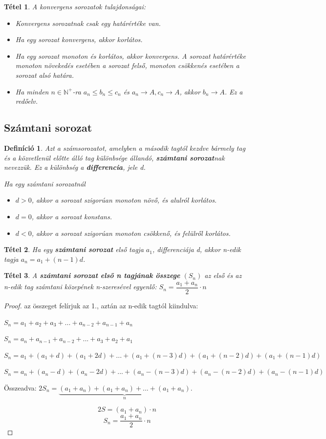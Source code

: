 \documentclass[12pt,a4paper]{article}
\newtheorem{theorem}{Tétel} [section]
\newtheorem{definition}{Definíció} [section]
\begin{document}
\begin{theorem}
A konvergens sorozatok tulajdonságai:
\begin{itemize}
\item Konvergens sorozatnak csak egy határértéke van.
\item Ha egy sorozat konvergens, akkor korlátos.
\item Ha egy sorozat monoton és korlátos, akkor konvergens. A sorozat határértéke monoton növekedés esetében a sorozat felső, monoton csökkenés esetében a sorozat alsó határa.
\item Ha minden $n\in \mathbb{N}^+$-ra $a_n\leq b_n \leq c_n$ és $a_n\to A, c_n\to A$, akkor $b_n\to A$. Ez a redőelv.
\end{itemize}
\end{theorem}

\subsection{Számtani sorozat}
\begin{definition}
Azt a számsorozatot, amelyben a második tagtól kezdve bármely tag és a közvetlenül előtte álló tag különbsége állandó, \textbf{számtani sorozat}nak nevezzük. Ez a különbség a \textbf{differencia}, jele d.

Ha egy számtani sorozatnál
\begin{itemize}
\item $d > 0$, akkor a sorozat szigorúan monoton növő, és alulról korlátos.
\item $d = 0$, akkor a sorozat konstans.
\item $d < 0$, akkor a sorozat szigorúan monoton csökkenő, és felülről korlátos.
\end{itemize}
\end{definition}

\begin{theorem}
 Ha egy \textbf{számtani sorozat} első tagja $a_1$, differenciája d, akkor n-edik tagja $a_n = a_1 + (n - 1)d$.
\end{theorem}

\begin{theorem}
A \textbf{számtani sorozat első n tagjának összege} $(S_n)$ az első és az n-edik tag számtani közepének n-szeresével egyenlő: $S_n=\dfrac{a_1+a_n}{2}\cdot n$
\end{theorem}
\begin{proof}
az összeget felírjuk az 1., aztán az n-edik tagtól kiindulva:

$S_n=a_1+a_2+a_3+...+a_{n-2}+a_{n-1}+a_n$

$S_n=a_n+a_{n-1}+a_{n-2}+...+a_3+a_2+a_1$

$S_n=a_1+(a_1+d)+(a_1+2d)+...+(a_1+(n-3)d)+(a_1+(n-2)d)+(a_1+(n-1)d)$

$S_n=a_n+(a_n-d)+(a_n-2d)+...+(a_n-(n-3)d)+(a_n-(n-2)d)+(a_n-(n-1)d)$

Összeadva:
$2S_n=\underbrace{(a_1+a_n)+(a_1+a_n)+...+(a_1+a_n)}_{n}$.

$$2S=(a_1+a_n)\cdot n$$
$$S_n=\dfrac{a_1+a_n}{2}\cdot n$$
\end{proof}
\end{document}
